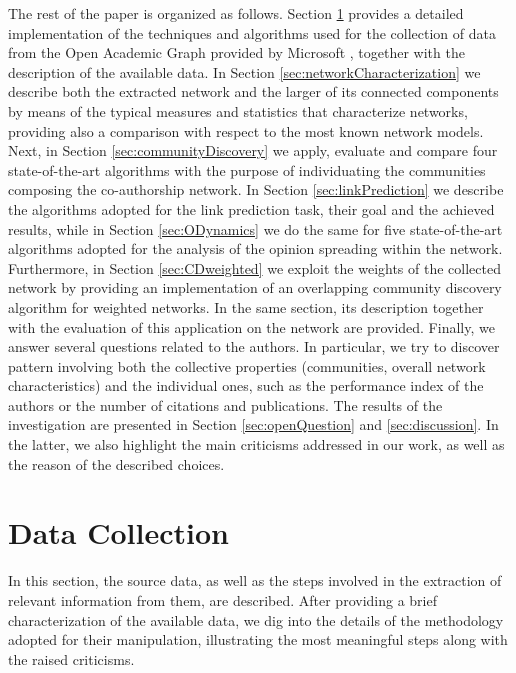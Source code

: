 \documentclass[sigchi]{acmart}
\begin{document}
The rest of the paper is organized as follows. Section \ref{sec:dataCollection} provides a detailed implementation of the techniques and algorithms used for the collection of data from the Open Academic Graph provided by Microsoft \cite{AMiner1}\cite{AMiner2}, together with the description of the available data. In Section \ref{sec:networkCharacterization} we describe both the extracted network and the larger of its connected components by means of the typical measures and statistics that characterize networks, providing also a comparison with respect to the most known network models. Next, in Section \ref{sec:communityDiscovery} we apply, evaluate and compare four state-of-the-art algorithms with the purpose of individuating the communities composing the co-authorship network. In Section \ref{sec:linkPrediction} we describe the algorithms adopted for the link prediction task, their goal and the achieved results, while in Section \ref{sec:ODynamics} we do the same for five state-of-the-art algorithms adopted for the analysis of the opinion spreading within the network. Furthermore, in Section \ref{sec:CDweighted} we exploit the weights of the collected network by providing an implementation of an overlapping community discovery algorithm for weighted networks. In the same section, its description together with the evaluation of this application on the network are provided. Finally, we  answer several questions related to the authors. In particular, we try to discover pattern involving both the collective properties (communities, overall network characteristics) and the individual ones, such as the performance index of the authors or the number of citations and publications. The results of the investigation are presented in Section \ref{sec:openQuestion} and \ref{sec:discussion}. In the latter, we also highlight the main criticisms addressed in our work, as well as the reason of the described choices.   

\section{Data Collection}\label{sec:dataCollection}
In this section, the source data, as well as the steps involved in the extraction of relevant information from them, are described. After providing a brief characterization of the available data, we dig into the details of the methodology adopted for their manipulation, illustrating the most meaningful steps along with the raised criticisms.
\end{document}
